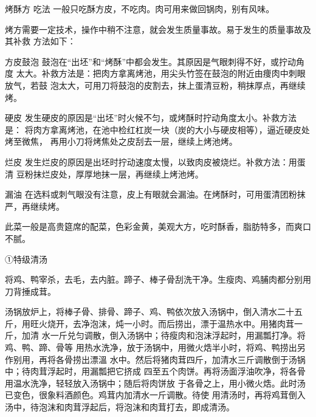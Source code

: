 \begin{recipe}{烤酥方}
\step 吃法 一般只吃酥方皮，不吃肉。肉可用来做回锅肉，别有风味。

\notice

烤方需要一定技术，操作中稍不注意，就会发生质量事故。易于发生的质量事故及其补救
方法如下：

\step 方皮鼓泡 鼓泡在“出坯”和“烤酥”中都会发生。其原因是气眼刺得不好，或拧动角度
太大。补救方法是：把肉方拿离烤池，用尖头竹签在鼓泡的附近由痩肉中刺眼放气，若鼓
泡太大，可用刀将鼓泡的皮割去，抹上蛋清豆粉，稍抹厚点，再继续烤。

\step 硬皮 发生硬皮的原因是“出坯”时火候不匀，或烤酥时拧动角度太小。补救方法是：
将肉方拿离烤池，在池中检红杠炭一块（炭的大小与硬皮相等），逼近硬皮处烤至微焦，
再用小刀将烤焦处之皮刮去一层，继续上烤池烤。

\step 烂皮 发生烂皮的原因是出坯时拧动速度太慢，以致肉皮被烧烂。补救方法：用蛋清
豆粉抹烂皮处，厚厚地抹一层，再继续上烤池烤。

\step 漏油 在选料或刺气眼没有注意，皮上有眼就会漏油。在烤酥时，可用蛋清团粉抹
严，再继续烤。

\features

此菜一般是高贵筵席的配菜，色彩金黄，美观大方，吃时酥香，脂肪特多，而爽口不腻。

①特级清汤

\ingredients


\cooking

\step 将鸡、鸭宰杀，去毛，去内脏。蹄子、棒子骨刮洗干净。生瘦肉、鸡脯肉都分别用
刀背捶成茸。

\step 汤锅放炉上，将棒子骨、排骨、蹄子、鸡、鸭依次放入汤锅中，倒入清水二十五
斤，用旺火烧开，去净泡沫，炖一小时。而后捞出，漂于温热水中。用猪肉茸一斤，加清
水一斤兑匀调散，倒入汤锅中；待瘦肉和泡沫浮起时，用漏瓢打净。将鸡、鸭、蹄、骨等
用热水洗净，放于汤锅中，用微火焅半小时，将鸡、鸭捞出另作别用，再将各骨捞出漂溫
水中。然后将猪肉茸四斤，加清水三斤调散倒于汤锅中；待肉茸浮起时，用漏瓢把它挤成
四至五个肉饼。再将汤面浮油吹净，将各骨用温水洗净，轻轻放入汤锅中；随后将肉饼放
于各骨之上，用小微火焅。此时汤已变色，很象料酒颜色。鸡茸内加清水一斤调散。待使
用清汤时，再将鸡茸倒入汤中，待泡沫和肉茸浮起后，将泡沫和肉茸打去，即成清汤。

\end{recipe}

